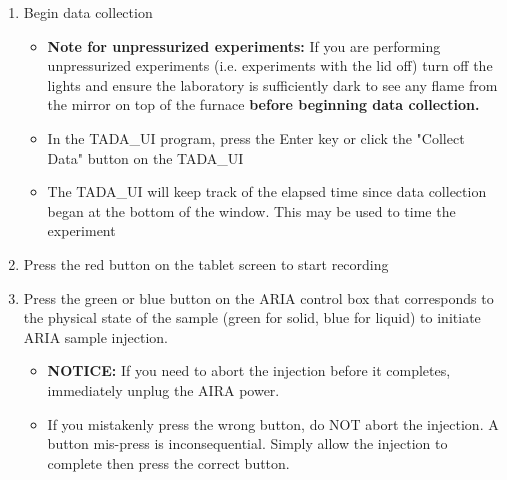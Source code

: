 \documentclass[letterpaper,11pt]{article}
\begin{document}
\begin{enumerate}
    \item Begin data collection 
        \begin{itemize}
        \item \textbf{Note for unpressurized experiments:} If you are performing
            unpressurized experiments (i.e. experiments with the lid off)
            turn off the lights and ensure the laboratory is sufficiently dark 
            to see any flame from the mirror on top of the furnace 
            \textbf{before beginning data collection.}
        \item In the TADA\_UI program, press the Enter key or click the 
            "Collect Data" button on the TADA\_UI
        \item The TADA\_UI will keep track of the elapsed time since data 
          collection began at the bottom of the window. This may be used
          to time the experiment
        \end{itemize}
    
    \item Press the red button on the tablet screen to start recording
        
    \item Press the green or blue button on the ARIA control box that 
        corresponds to the physical state of the sample
        (green for solid, blue for liquid) to initiate ARIA sample injection.
        \begin{itemize}
        \item \textbf{NOTICE:} If you need to abort the injection before
            it completes, immediately unplug the AIRA power.
        \item If you mistakenly press the wrong button, do NOT abort the 
            injection. A button mis-press is inconsequential. Simply allow the 
            injection to complete then press the correct button.
        \end{itemize}
    

\end{enumerate}
\end{document}
